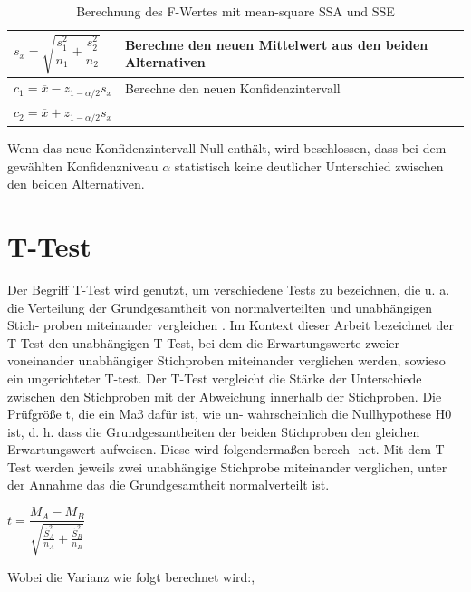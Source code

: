 \begin{center}
  \begin{table}[h!]
    \begin{tabularx}{\textwidth}{|X|X|}
      \hline
       $s_x =  \sqrt{\dfrac{s^2_1}{n_1} + \dfrac{s^2_2}{n_2}}$ & Berechne den neuen Mittelwert aus den beiden Alternativen  \\ 
      \hline
      $c_1 = \overline{x} - z_{1-\alpha/2} s_x$ & Berechne den neuen Konfidenzintervall \\
      $c_2 = \overline{x} + z_{1-\alpha/2} s_x$ & \\
      \hline
    \end{tabularx}
    \caption{Berechnung des F-Wertes mit mean-square SSA und SSE}
    \label{tab:two_Iteration_Konfidenzintervall}
  \end{table}
\end{center}

Wenn das neue Konfidenzintervall Null enthält, wird beschlossen,
dass bei dem gewählten Konfidenzniveau $\alpha$ statistisch keine
deutlicher Unterschied zwischen den beiden Alternativen.

\section{T-Test}
Der Begriff T-Test wird genutzt, um verschiedene Tests zu bezeichnen, die
u. a. die Verteilung der Grundgesamtheit von normalverteilten und unabhängigen Stich-
proben miteinander vergleichen \cite{inferenzstatistik}. Im Kontext dieser Arbeit bezeichnet
der T-Test den unabhängigen T-Test, bei dem die Erwartungswerte zweier voneinander
unabhängiger Stichproben miteinander verglichen werden, sowieso ein ungerichteter T-test.
Der T-Test vergleicht die Stärke der Unterschiede zwischen den Stichproben mit der
Abweichung innerhalb der Stichproben. Die Prüfgröße t, die ein Maß dafür ist, wie un-
wahrscheinlich die Nullhypothese H0 ist, d. h. dass die Grundgesamtheiten der beiden
Stichproben den gleichen Erwartungswert aufweisen. Diese wird folgendermaßen berech-
net.
Mit dem T-Test werden jeweils zwei unabhängige Stichprobe miteinander verglichen, 
unter der Annahme das die Grundgesamtheit normalverteilt ist.

\begin{center}
  $t = \dfrac{M_A-M_B}{\sqrt{\frac{\hat{S}_A^2}{n_A} + \frac{\hat{S}_B^2}{n_B}}}$
\end{center}

Wobei die Varianz wie folgt berechnet wird:,

